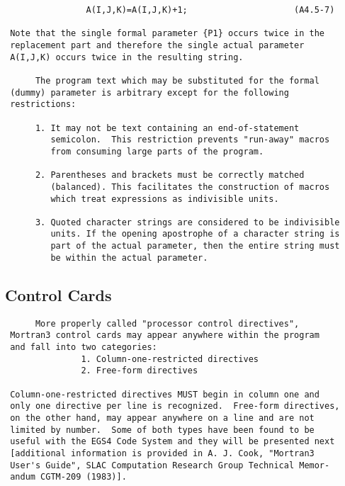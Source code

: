 \begin{verbatim}
                A(I,J,K)=A(I,J,K)+1;                     (A4.5-7)

 Note that the single formal parameter {P1} occurs twice in the
 replacement part and therefore the single actual parameter
 A(I,J,K) occurs twice in the resulting string.

      The program text which may be substituted for the formal
 (dummy) parameter is arbitrary except for the following
 restrictions:

      1. It may not be text containing an end-of-statement
         semicolon.  This restriction prevents "run-away" macros
         from consuming large parts of the program.

      2. Parentheses and brackets must be correctly matched
         (balanced). This facilitates the construction of macros
         which treat expressions as indivisible units.

      3. Quoted character strings are considered to be indivisible
         units. If the opening apostrophe of a character string is
         part of the actual parameter, then the entire string must
         be within the actual parameter.
 \end{verbatim}
 \subsection{Control Cards}
 \begin{verbatim}
      More properly called "processor control directives",
 Mortran3 control cards may appear anywhere within the program
 and fall into two categories:
               1. Column-one-restricted directives
               2. Free-form directives

 Column-one-restricted directives MUST begin in column one and
 only one directive per line is recognized.  Free-form directives,
 on the other hand, may appear anywhere on a line and are not
 limited by number.  Some of both types have been found to be
 useful with the EGS4 Code System and they will be presented next
 [additional information is provided in A. J. Cook, "Mortran3
 User's Guide", SLAC Computation Research Group Technical Memor-
 andum CGTM-209 (1983)].
 \end{verbatim}
